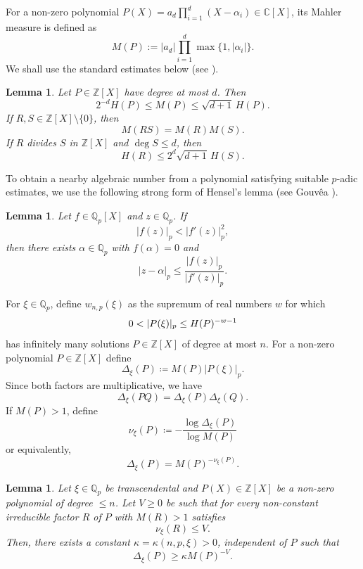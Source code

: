\documentclass[10pt,a4paper]{amsart}
\newtheorem{lemma}[theorem]{Lemma}
\newcommand{\Z}{\mathbb Z}
\newcommand{\Qp}{\mathbb Q_p}
\newcommand{\Zp}{\mathbb Z_p}
\begin{document}
For a non-zero polynomial $P(X)=a_d\prod_{i=1}^d(X-\alpha_i)\in\mathbb C[X]$, its Mahler measure is defined as
$$
M(P):= |a_d|\prod_{i=1}^d\max\{1,|\alpha_i|\}.
$$
We shall use the standard estimates below (see
\cite[Sections~1.6--1.7]{BombieriGubler}).

\begin{lemma}\label{lem:height-mahler}
Let $P\in\Z[X]$ have degree at most $d$. Then
$$
2^{-d}H(P)\leq M(P)\leq\sqrt{d+1}\,H(P).
$$
If $R,S\in\Z[X]\setminus\{0\}$, then
$$
M(RS)=M(R)M(S).
$$
If $R$ divides $S$ in $\Z[X]$ and $\deg S\leq d$, then
$$
H(R)\leq 2^d\sqrt{d+1}\,H(S).
$$
\end{lemma}


To obtain a nearby algebraic number from a polynomial satisfying suitable
$p$-adic estimates, we use the following strong form of Hensel's lemma (see
Gouv\^ea \cite{Gouvea}).

\begin{lemma}\label{lem:hensel}
Let $f\in\Qp[X]$ and $z\in\Qp$. If
$$
|f(z)|_p<|f'(z)|_p^2,
$$
then there exists $\alpha\in\Qp$ with $f(\alpha)=0$ and
$$
|z-\alpha|_p\leq\frac{|f(z)|_p}{|f'(z)|_p}.
$$
\end{lemma}

For $\xi\in \Qp$, define $w_{n,p}(\xi)$ as the supremum of real numbers $w$ for which
\begin{equation}\label{defn:w_{n,p}}
0<|P(\xi)|_p\leq H(P)^{-w-1}
\end{equation}
has infinitely many solutions $P\in\Z[X]$ of degree at most $n$. For a non-zero polynomial $P\in\Z[X]$ define
$$
\Delta_\xi(P)\coloneqq M(P)|P(\xi)|_p.
$$
Since both factors are multiplicative, we have
$$
\Delta_\xi(PQ)=\Delta_\xi(P)\Delta_\xi(Q).
$$
If $M(P)>1$, define
$$
\nu_\xi(P)
\coloneqq-\frac{\log\Delta_\xi(P)}{\log M(P)}
$$
or equivalently,
$$
\Delta_\xi(P)=M(P)^{-\nu_\xi(P)}.
$$

\begin{lemma}\label{lem:factor-lower}
Let $\xi\in\Qp$ be transcendental and $P(X)\in\Z[X]$ be a non-zero polynomial of degree $\leq n$. Let $V\geq 0$ be such that for every non-constant irreducible factor $R$ of $P$ with $M(R)>1$ satisfies
$$
\nu_\xi(R)\leq V.
$$
Then, there exists a constant $\kappa=\kappa(n,p,\xi)>0$, independent of $P$ such that 
$$
\Delta_\xi(P)\geq\kappa M(P)^{-V}.
$$
\end{lemma}
\end{document}
